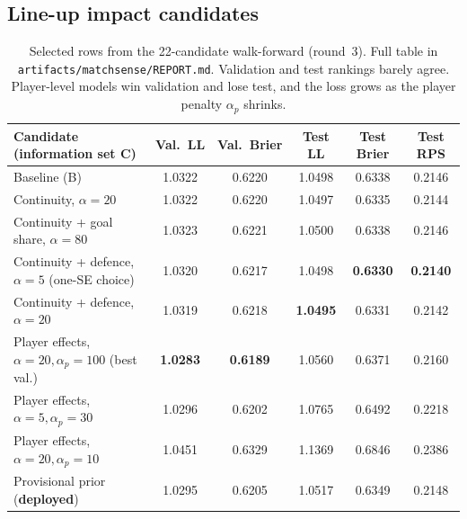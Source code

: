 \documentclass[11pt,a4paper]{article}
\newcommand{\code}[1]{\texttt{\small #1}}
\begin{document}
\subsection{Line-up impact candidates}

\begin{table}[h]
\centering\small
\begin{tabular}{@{}lccccc@{}}
\toprule
Candidate (information set C) & Val.\ LL & Val.\ Brier & Test LL & Test Brier & Test RPS\\
\midrule
Baseline (B) & 1.0322 & 0.6220 & 1.0498 & 0.6338 & 0.2146\\
Continuity, $\alpha=20$ & 1.0322 & 0.6220 & 1.0497 & 0.6335 & 0.2144\\
Continuity + goal share, $\alpha=80$ & 1.0323 & 0.6221 & 1.0500 & 0.6338 & 0.2146\\
Continuity + defence, $\alpha=5$ (one-SE choice) & 1.0320 & 0.6217 & 1.0498 & \textbf{0.6330} & \textbf{0.2140}\\
Continuity + defence, $\alpha=20$ & 1.0319 & 0.6218 & \textbf{1.0495} & 0.6331 & 0.2142\\
Player effects, $\alpha=20,\alpha_p=100$ (best val.) & \textbf{1.0283} & \textbf{0.6189} & 1.0560 & 0.6371 & 0.2160\\
Player effects, $\alpha=5,\alpha_p=30$ & 1.0296 & 0.6202 & 1.0765 & 0.6492 & 0.2218\\
Player effects, $\alpha=20,\alpha_p=10$ & 1.0451 & 0.6329 & 1.1369 & 0.6846 & 0.2386\\
Provisional prior (\textbf{deployed}) & 1.0295 & 0.6205 & 1.0517 & 0.6349 & 0.2148\\
\bottomrule
\end{tabular}
\caption{Selected rows from the 22-candidate walk-forward (round~3). Full table
in \code{artifacts/matchsense/REPORT.md}. Validation and test rankings barely
agree. Player-level models win validation and lose test,
and the loss grows as the player penalty $\alpha_p$ shrinks.}
\label{tab:candidates}
\end{table}
\end{document}
